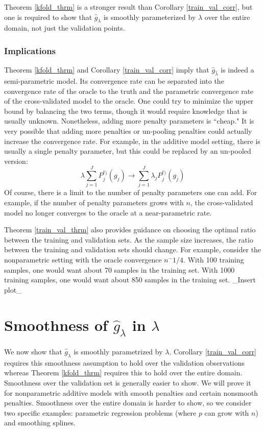 \documentclass[12pt]{article}
\begin{document}
Theorem \ref{kfold_thrm} is a stronger result than Corollary \ref{train_val_corr}, but one is required to show that $\hat{g}_\lambda$ is smoothly parameterized by $\lambda$ over the entire domain, not just the validation points.

\subsubsection{Implications}

Theorem \ref{kfold_thrm} and Corollary \ref{train_val_corr} imply that $\hat{g}_{\hat{\lambda}}$ is indeed a semi-parametric model. Its convergence rate can be separated into the convergence rate of the oracle to the truth and the parametric convergence rate of the cross-validated model to the oracle. One could try to minimize the upper bound by balancing the two terms, though it would require knowledge that is usually unknown. Nonetheless, adding more penalty parameters is ``cheap." It is very possible that adding more penalties or un-pooling penalties could actually increase the convergence rate. For example, in the additive model setting, there is usually a single penalty parameter, but this could be replaced by an un-pooled version:
\begin{equation}
\lambda \sum_{j=1}^J P_j^{v_j}(g_j) \rightarrow  \sum_{j=1}^J \lambda_j P_j^{v_j}(g_j)
\end{equation}
Of course, there is a limit to the number of penalty parameters one can add. For example, if the number of penalty parameters grows with $n$, the cross-validated model no longer converges to the oracle at a near-parametric rate.

Theorem \ref{train_val_thrm} also provides guidance on choosing the optimal ratio between the training and validation sets. As the sample size increases, the ratio between the training and validation sets should change. For example, consider the nonparametric setting with the oracle convergence $n^-1/4$. With 100 training samples, one would want about 70 samples in the training set. With 1000 training samples, one would want about 850 samples in the training set. \_Insert plot\_

\section{Smoothness of $\hat{g}_\lambda$ in $\lambda$}\label{sec:entropy}

We now show that $\hat{g}_\lambda$ is smoothly parametrized by $\lambda$. Corollary \ref{train_val_corr} requires this smoothness assumption to hold over the validation observations whereas Theorem \ref{kfold_thrm} requires this to hold over the entire domain. Smoothness over the validation set is generally easier to show. We will prove it for nonparametric additive models with smooth penalties and certain nonsmooth penalties. Smoothness over the entire domain is harder to show, so we consider two specific examples: parametric regression problems (where $p$ can grow with $n$) and smoothing splines.
\end{document}
